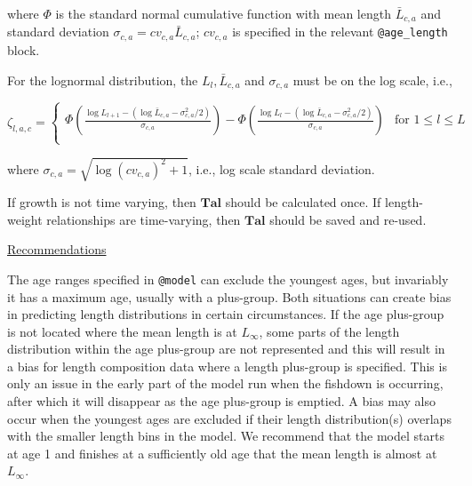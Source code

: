 \documentclass[a4paper,11pt,twoside,pdftex,draft]{article}
\begin{document}
where $\Phi$ is the standard normal cumulative function with mean length $\bar L_{c,a}$ and standard deviation $\sigma_{c,a} = cv_{c,a} \bar L_{c,a}$; $cv_{c,a}$ is specified in the relevant  \texttt{@age\_length} block.

For the lognormal distribution, the $L_{l}, \bar L_{c,a}$ and $\sigma_{c,a}$ must be on the log scale, i.e.,

\begin{equation}
\zeta_{l,a,c} =
\begin{cases}

\Phi\left( \frac{\log L_{l+1} - \left( \log\bar L_{c,a}  - \sigma_{c,a}^2/2 \right)}{\sigma_{c,a}} \right) - \Phi\left( \frac{\log L_{l} - \left( \log\bar L_{c,a}  - \sigma_{c,a}^2/2 \right)}{\sigma_{c,a}} \right) & \text{for } 1 \leq l \leq L \\

\end{cases}
\end{equation}

where $\sigma_{c,a} = \sqrt{\log(cv_{c,a})^2 + 1}$, i.e., log scale standard deviation.

If growth is not time varying, then $\mathbf{Tal}$ should be calculated once. If length-weight relationships are time-varying, then $\mathbf{Tal}$ should be saved and re-used.

\bigskip
\underline{Recommendations}

The age ranges specified in \texttt{@model} can exclude the youngest ages, but invariably it has a maximum age, usually with a plus-group. Both situations can create bias in predicting length distributions in certain circumstances.  If the age plus-group is not located where the mean length is at $L_{\infty}$, some parts of the length distribution within the age plus-group are not represented and this will result in a bias for length composition data where a length plus-group is specified. This is only an issue in the early part of the model run when the fishdown is occurring, after which it will disappear as the age plus-group is emptied.  A bias may also occur when the youngest ages are excluded if their length distribution(s) overlaps with the smaller length bins in the model. We recommend that the model starts at age 1 and finishes at a sufficiently old age that the mean length is almost at $L_{\infty}$. 
\end{document}
